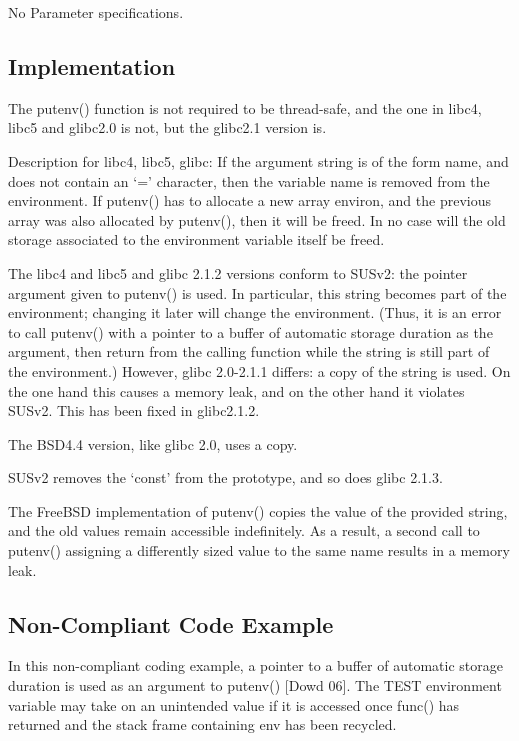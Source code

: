    No Parameter specifications.

\subsection{Implementation}

The putenv() function is not required to be thread-safe, and the one in libc4,
libc5 and glibc2.0 is not, but the glibc2.1 version is.

Description for libc4, libc5, glibc: If the argument string is of the form name,
and does not contain an `=' character, then the variable name is removed from
the environment. If putenv() has to allocate a new array environ, and the
previous array was also allocated by putenv(), then it will be freed. In no case
will the old storage associated to the environment variable itself be freed.

The libc4 and libc5 and glibc 2.1.2 versions conform to SUSv2: the pointer
argument given to putenv() is used. In particular, this string becomes part of
the environment; changing it later will change the environment. (Thus, it is an
error to call putenv() with a pointer to a buffer of automatic storage duration
as the argument, then return from the calling function while the string is still
part of the environment.) However, glibc 2.0-2.1.1 differs: a copy of the string
is used. On the one hand this causes a memory leak, and on the other hand it
violates SUSv2. This has been fixed in glibc2.1.2.

The BSD4.4 version, like glibc 2.0, uses a copy.

SUSv2 removes the `const' from the prototype, and so does glibc 2.1.3.

The FreeBSD implementation of putenv() copies the value of the provided string,
and the old values remain accessible indefinitely. As a result, a second call to
putenv() assigning a differently sized value to the same name results in a
memory leak.

\subsection{Non-Compliant Code Example}

In this non-compliant coding example, a pointer to a buffer of automatic storage
duration is used as an argument to putenv() [Dowd 06]. The TEST environment
variable may take on an unintended value if it is accessed once func() has
returned and the stack frame containing env has been recycled.

